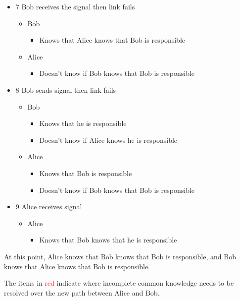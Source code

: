 \documentclass[../HFT-main.tex]{subfiles}
\begin{document}
\begin{itemize}
    \item 7 Bob receives the signal then link fails
    \begin{itemize}
        \item Bob
        \begin{itemize}
            \item Knows that Alice knows that Bob is responsible
        \end{itemize}
        \item Alice
        \begin{itemize}
            \item Doesn’t know if Bob knows that Bob is responsible
        \end{itemize}
    \end{itemize}

    \item 8 Bob sends signal then link fails
    \begin{itemize}
        \item Bob
        \begin{itemize}
            \item Knows that he is responsible
            \item Doesn’t know if Alice knows he is responsible
        \end{itemize}
        \item Alice
        \begin{itemize}
            \item Knows that Bob is responsible
            \item Doesn’t know if Bob knows that Bob is responsible
        \end{itemize}
    \end{itemize}

    \item 9 Alice receives signal
    \begin{itemize}
        \item Alice
        \begin{itemize}
            \item Knows that Bob knows that he is responsible
        \end{itemize}
    \end{itemize}
\end{itemize}

At this point, Alice knows that Bob knows that Bob is responsible, and Bob knows that
Alice knows that Bob is responsible.

The items in \textcolor{red}{red} indicate where incomplete common knowledge needs to be resolved
over the new path between Alice and Bob.
\end{document}
